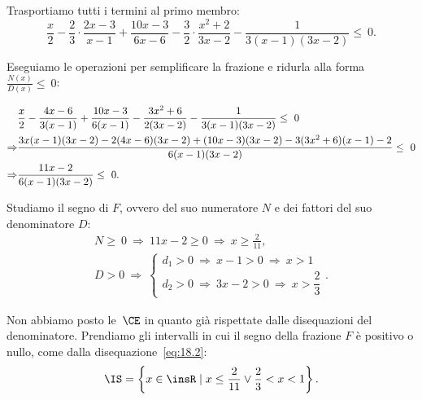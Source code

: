 \begin{exrig}
\begin{esempio}
Trasportiamo tutti i termini al primo membro:
\[\frac{x}{2}-\frac{2}{3}\cdot\frac{2x-3}{x-1}+\frac{10x-3}{6x-6}-\frac{3}{2}\cdot\frac{x^{2}+2}{3x-2}-\frac{1}{3(x-1)(3x-2)}\le~0.\]

Eseguiamo le operazioni per semplificare la frazione e ridurla alla
forma~$\frac{N(x)}{D(x)}\le~0$:

\begin{align}
  &\frac{x}{2}-\frac{4x-6}{3(x-1)}+\frac{10x-3}{6(x-1)}-\frac{3x^{2}+6}{2(3x-2)}-\frac{1}{3(x-1)(3x-2)}\le~0\notag\\
  \Rightarrow &\frac{3x(x-1)(3x-2)-2(4x-6)(3x-2)+(10x-3)(3x-2)-3(3x^{2}+6)(x-1)-2}{6(x-1)(3x-2)}\le~0\notag\\
  \Rightarrow &\frac{11x-2}{6(x-1)(3x-2)}\le~0. \label{eq:18.2}
\end{align}

Studiamo il segno di $F$, ovvero del suo numeratore $N$ e dei fattori del suo denominatore $D$:
 \[\begin{gathered}N\ge~0\:\Rightarrow\: 11x-2\ge 0\:\Rightarrow\: x\ge\frac{2}{11}\text{,}\\
		  D>0\:\Rightarrow\:\left\{\begin{array}{l}
			d_{1}>0\:\Rightarrow\: x-1>0\:\Rightarrow\: x>1\\
			d_{2}>0\:\Rightarrow\: 3x-2>0\:\Rightarrow\: x>\dfrac{2}{3}
			\end{array}\right.. \end{gathered}\]
\begin{center}

\end{center}
\pagebreak
Non abbiamo posto le~$\CE$ in quanto già rispettate dalle disequazioni
del denominatore. Prendiamo gli intervalli in cui il segno della frazione $F$ è positivo o
nullo, come dalla disequazione~\ref{eq:18.2}:
\[\IS=\left\{x\in \insR\mid x\le\frac{2}{11}\vee \frac{2}{3}<x<1\right\}.\]
 \end{esempio}
\end{exrig}
\ovalbox{\risolvii \ref{ese:18.57}, \ref{ese:18.58}, \ref{ese:18.59}, \ref{ese:18.60}, \ref{ese:18.61}, \ref{ese:18.62}, \ref{ese:18.63}, \ref{ese:18.64}, \ref{ese:18.65}, \ref{ese:18.66}}

\vspazio\ovalbox{\ref{ese:18.67}, \ref{ese:18.68}, \ref{ese:18.69}, \ref{ese:18.70}, \ref{ese:18.71}, \ref{ese:18.72}, \ref{ese:18.73}, \ref{ese:18.74}, \ref{ese:18.75}, \ref{ese:18.76}}
\newpage

\cleardoublepage
